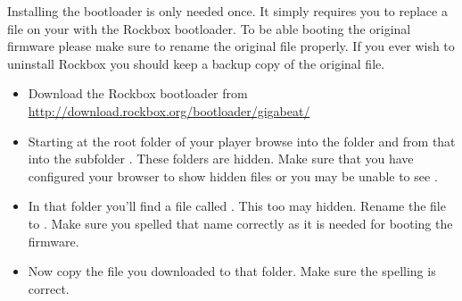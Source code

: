 
Installing the bootloader is only needed once. It simply requires you
to replace a file on your \dap{} with the Rockbox bootloader. To be able
booting the original firmware please make sure to rename the original file
properly. If you ever wish to uninstall Rockbox you should keep a backup copy
of the original file.

\begin{itemize}
\item Download the Rockbox bootloader from
  \url{http://download.rockbox.org/bootloader/gigabeat/}
\item Starting at the root folder of your player browse into the folder
   and from that into the subfolder .
  These folders are hidden. Make sure that you have configured your browser
  to show hidden files or you may be unable to see .
\item In that folder you'll find a file called . This too
  may hidden. Rename the file to . Make sure you
  spelled that name  correctly as it is needed for booting the \playerman{} firmware.
\item Now copy the file  you downloaded to that folder.
  Make sure the spelling is correct.
\end{itemize}

